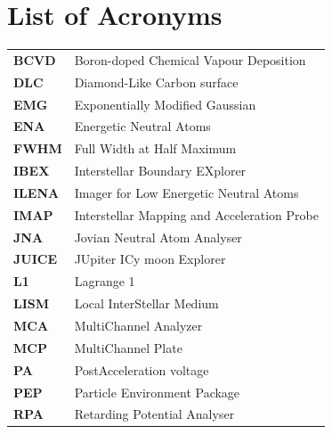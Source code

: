 \documentclass[a4paper, 12pt, abstracton]{scrartcl}
\begin{document}
	\section*{List of Acronyms}
	
	\begin{tabular}{>{\bfseries}l|l}
		
		BCVD  & Boron-doped Chemical Vapour Deposition \\ 
		
		DLC   & Diamond-Like Carbon surface \\ 
		
		EMG   & Exponentially Modified Gaussian \\ 
		
		ENA   & Energetic Neutral Atoms \\ 
		
		FWHM  & Full Width at Half Maximum \\ 
		
		IBEX  & Interstellar Boundary EXplorer \\ 
		
		ILENA & Imager for Low Energetic Neutral Atoms \\ 
		
		IMAP  & Interstellar Mapping and Acceleration Probe \\ 
		
		JNA   & Jovian Neutral Atom Analyser \\ 
		
		JUICE & JUpiter ICy moon Explorer \\ 
		
		L1    & Lagrange 1 \\
		
		LISM  & Local InterStellar Medium\\
		
		MCA   & MultiChannel Analyzer \\ 
		
		MCP   & MultiChannel Plate \\ 
		
		PA    & PostAcceleration voltage \\ 
		
		PEP   & Particle Environment Package \\
		
		RPA   & Retarding Potential Analyser \\
		
	\end{tabular}
	\newpage
	\thispagestyle{empty}
	\null
	\newpage
	
\end{document}
